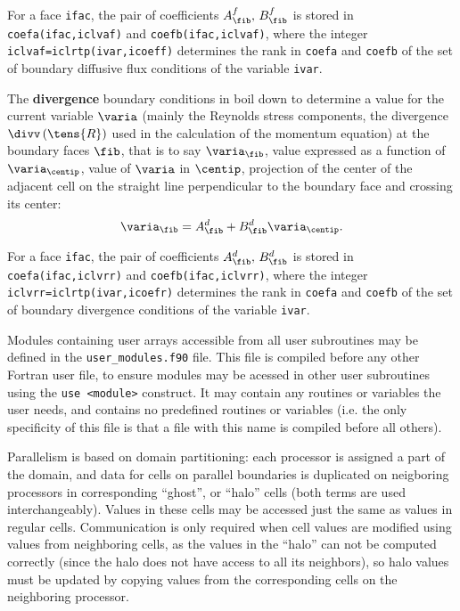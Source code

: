 {{{For a face \texttt{ifac}, the pair of coefficients $A_{\fib}^f , \, B_{\fib}^f$ is
stored in \texttt{coefa(ifac,iclvaf)} and
\texttt{coefb(ifac,iclvaf)}, where the integer \texttt{iclvaf=iclrtp(ivar,icoeff)}
determines the rank in \texttt{coefa} and \texttt{coefb} of the set of boundary
diffusive flux conditions of the variable \texttt{ivar}. 

The \textbf{divergence} boundary conditions in \CS boil down to determine a value for the
current variable $\varia$ (mainly the Reynolds stress components, the divergence $\divv \left(\tens{R} \right)$ used in the calculation of the momentum equation) at the boundary faces $\fib$, 
that is to say $\varia_\fib$,
value expressed as a function of $\varia_{\centip}$, value of $\varia$ in $\centip$,
projection of the center of the adjacent cell on the straight line
perpendicular to the boundary face and crossing its center:
\begin{equation}
\varia_\fib=A_{\fib}^d +B_{\fib}^d \varia_{\centip}.
\end{equation}

For a face \texttt{ifac}, the pair of coefficients $A_{\fib}^d , \, B_{\fib}^d$ is
stored in \texttt{coefa(ifac,iclvrr)} and
\texttt{coefb(ifac,iclvrr)}, where the integer \texttt{iclvrr=iclrtp(ivar,icoefr)}
determines the rank in \texttt{coefa} and \texttt{coefb} of the set of boundary
divergence conditions of the variable \texttt{ivar}. 

\clearpage
Modules containing user arrays accessible from all user subroutines may
be defined in the \texttt{user\_modules.f90} file. This file is
compiled before any other Fortran user file, to ensure modules
may be acessed in other user subroutines using the \texttt{use <module>}
construct. It may contain any routines or variables the user needs,
and contains no predefined routines or variables (i.e. the only
specificity of this file is that a file with this name is compiled before
all others).


Parallelism is based on domain partitioning: each processor is assigned
a part of the domain, and data for cells on parallel boundaries
is duplicated on neigboring processors in corresponding ``ghost'',
or ``halo'' cells (both terms are used interchangeably). Values in
these cells may be accessed just the same as values in regular cells.
Communication is only required when cell values are modified
using values from neighboring cells, as the values in the ``halo'' can
not be computed correctly (since the halo does not have access to all
its neighbors), so halo values must be updated by copying values from
the corresponding cells on the neighboring processor.

}}}
